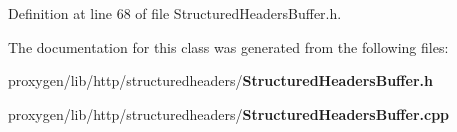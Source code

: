 Definition at line 68 of file Structured\+Headers\+Buffer.\+h.



The documentation for this class was generated from the following files\+:\begin{DoxyCompactItemize}
\item 
proxygen/lib/http/structuredheaders/{\bf Structured\+Headers\+Buffer.\+h}\item 
proxygen/lib/http/structuredheaders/{\bf Structured\+Headers\+Buffer.\+cpp}\end{DoxyCompactItemize}
